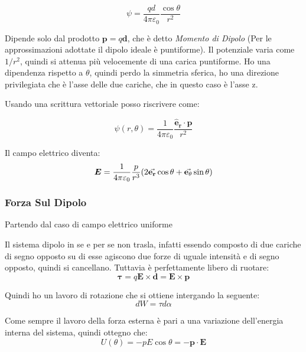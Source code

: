 \documentclass[a4paper]{scrarticle}
\begin{document}
\begin{equation}
    \psi = \frac{qd}{4\pi\varepsilon_0}\frac{\cos\theta}{r^2}
\end{equation}

Dipende solo dal prodotto $\bm p = q \bm d$, che è detto \emph{Momento di Dipolo} (Per le approssimazioni adottate il dipolo ideale è puntiforme).
Il potenziale varia come $1/r^2$, quindi si attenua più velocemente di una carica puntiforme.
Ho una dipendenza rispetto a $\theta$, quindi perdo la simmetria sferica, ho una direzione privilegiata che è l'asse delle due cariche, che in questo caso è l'asse z.

Usando una scrittura vettoriale posso riscrivere come:

\begin{equation}
    \psi(r, \theta) = \frac{1}{4 \pi \varepsilon_0} \frac{\bm{\hat e_r} \cdot \bm p}{r^2}
\end{equation}

Il campo elettrico diventa:
\begin{equation}
    \bm E = \frac{1}{4\pi\varepsilon_0} \frac{p}{r^3} (2 \va{ e_r}\cos \theta + \va{ e_\theta} \sin\theta )
\end{equation}

\subsubsection*{Forza Sul Dipolo}

Partendo dal caso di campo elettrico uniforme

Il sistema dipolo in se e per se non trasla, infatti essendo composto di due cariche di segno opposto su di esse agiscono due forze di uguale intensità e di segno opposto, quindi si cancellano. Tuttavia è perfettamente libero di ruotare:
\begin{equation}
    \bm \tau = q \bm E \times \bm d = \bm E \times \bm p
\end{equation}

Quindi ho un lavoro di rotazione che si ottiene intergando la seguente:
\begin{equation*}
    dW = \tau d\alpha
\end{equation*}

Come sempre il lavoro della forza esterna è pari a una variazione dell'energia interna del sistema, quindi ottegno che:
\begin{equation*}
    U(\theta) = -pE\cos \theta = - \bm p \cdot \bm E
\end{equation*}
\end{document}
